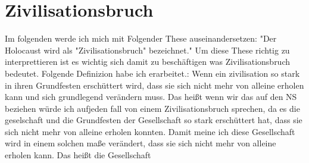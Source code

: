 \documentclass{article}
\begin{document}
\newpage

\section{Zivilisationsbruch}
Im folgenden werde ich mich mit Folgender These auseinandersetzen: "Der Holocaust wird als "Zivilisationsbruch" bezeichnet."
Um diese These richtig zu interprettieren ist es wichtig sich damit zu beschäftigen was Zivilisationsbruch bedeutet. Folgende Definizion habe
ich erarbeitet.: Wenn ein zivilisation so stark in ihren Grundfesten erschüttert wird, dass sie sich nicht mehr von alleine erholen kann
und sich grundlegend verändern muss. Das heißt wenn wir das auf den NS beziehen würde ich aufjeden fall von einem Zivilisationsbruch sprechen,
da es die geselschaft und die Grundfesten der Gesellschaft so stark erschüttert hat, dass sie sich nicht mehr von alleine erholen konnten.
Damit meine ich diese Gesellschaft wird in einem solchen maße verändert, dass sie sich nicht mehr von alleine erholen kann. Das heißt die Gesellschaft
\end{document}
